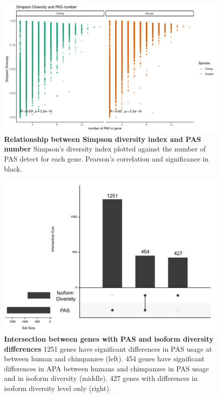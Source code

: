 \begin{figure}[!htb]
\centering
\includegraphics[width=5in]{img/ch03/Fig2-figSup6.pdf}
\caption[Relationship between Simpson diversity index and PAS number]{\textbf{Relationship between Simpson diversity index and PAS number} Simpson's diversity index plotted against the number of PAS detect for each gene. Pearson's correlation and significance in black.}
\label{fig:ch03-simpNum}
\end{figure}
\clearpage

\begin{figure}[!htb]
\centering
\includegraphics[width=5in]{img/ch03/Fig2_figSup7.pdf}
\caption[Intersection between genes with PAS and isoform diversity differences]{\textbf{Intersection between genes with PAS and isoform diversity differences} 1251 genes have significant differences in PAS usage at between human and chimpanzee (left). 454 genes have significant differences in APA between humans and chimpanzee in PAS usage and in isoform diversity (middle). 427 genes with differences in isoform diversity level only (right).}
\label{fig:ch03-upsetr}
\end{figure}
\clearpage




